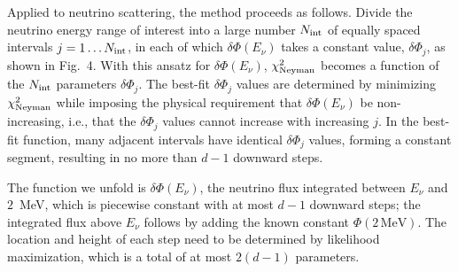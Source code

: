 
Applied to neutrino scattering, the method proceeds as follows. Divide the neutrino energy
range of interest into a large number $N_{\rm int}$ of equally spaced intervals
$j=1\dots N_{\rm int}$, in each of which $\delta\Phi(E_\nu)$ takes a constant value,
$\delta\Phi_j$, as shown in Fig.~4. With this ansatz for $\delta\Phi(E_\nu)$,
$\chi^2_{\rm Neyman}$ becomes a function of the $N_{\rm int}$ parameters $\delta\Phi_j$. The
best-fit $\delta\Phi_j$ values are determined by minimizing $\chi^2_{\rm Neyman}$ while
imposing the physical requirement that $\delta\Phi(E_\nu)$ be non-increasing, i.e., that the
$\delta\Phi_j$ values cannot increase with increasing $j$. In the best-fit function, many
adjacent intervals have identical $\delta\Phi_j$ values, forming a constant segment, resulting
in no more than $d-1$ downward steps.


The function we unfold is $\delta\Phi(E_\nu)$, the neutrino flux integrated between $E_\nu$
and $2$~MeV, which is piecewise constant with at most $d-1$ downward steps; the integrated
flux above $E_\nu$ follows by adding the known constant $\Phi(2\,\mathrm{MeV})$. The location
and height of each step need to be determined by likelihood maximization, which is a total of
at most $2(d-1)$ parameters.



